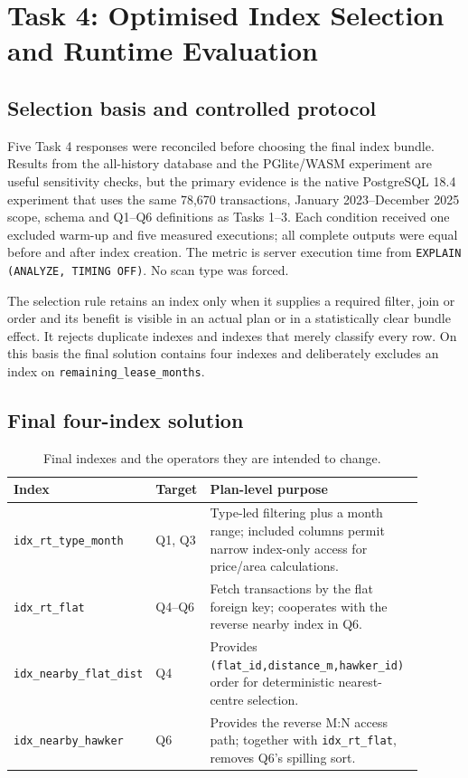 \fi
\section{Task 4: Optimised Index Selection and Runtime Evaluation}
\subsection{Selection basis and controlled protocol}
Five Task 4 responses were reconciled before choosing the final index bundle. Results from the
all-history database and the PGlite/WASM experiment are useful sensitivity checks, but the primary
evidence is the native PostgreSQL 18.4 experiment that uses the same 78,670 transactions, January
2023--December 2025 scope, schema and Q1--Q6 definitions as Tasks 1--3. Each condition received
one excluded warm-up and five measured executions; all complete outputs were equal before and
after index creation. The metric is server execution time from \texttt{EXPLAIN (ANALYZE,
TIMING OFF)}. No scan type was forced.

The selection rule retains an index only when it supplies a required filter, join or order and its
benefit is visible in an actual plan or in a statistically clear bundle effect. It rejects duplicate
indexes and indexes that merely classify every row. On this basis the final solution contains four
indexes and deliberately excludes an index on \texttt{remaining\_lease\_months}.

\subsection{Final four-index solution}


\begin{table}[H]\centering\small
\begin{tabular}{p{0.25\linewidth}p{0.13\linewidth}p{0.52\linewidth}}
\toprule
Index & Target & Plan-level purpose \\
\midrule
\texttt{idx\_rt\_type\_month} & Q1, Q3 & Type-led filtering plus a month range; included columns permit narrow index-only access for price/area calculations. \\
\texttt{idx\_rt\_flat} & Q4--Q6 & Fetch transactions by the flat foreign key; cooperates with the reverse nearby index in Q6. \\
\texttt{idx\_nearby\_flat\_dist} & Q4 & Provides \texttt{(flat\_id,distance\_m,hawker\_id)} order for deterministic nearest-centre selection. \\
\texttt{idx\_nearby\_hawker} & Q6 & Provides the reverse M:N access path; together with \texttt{idx\_rt\_flat}, removes Q6's spilling sort. \\
\bottomrule
\end{tabular}
\caption{Final indexes and the operators they are intended to change.}
\end{table}

